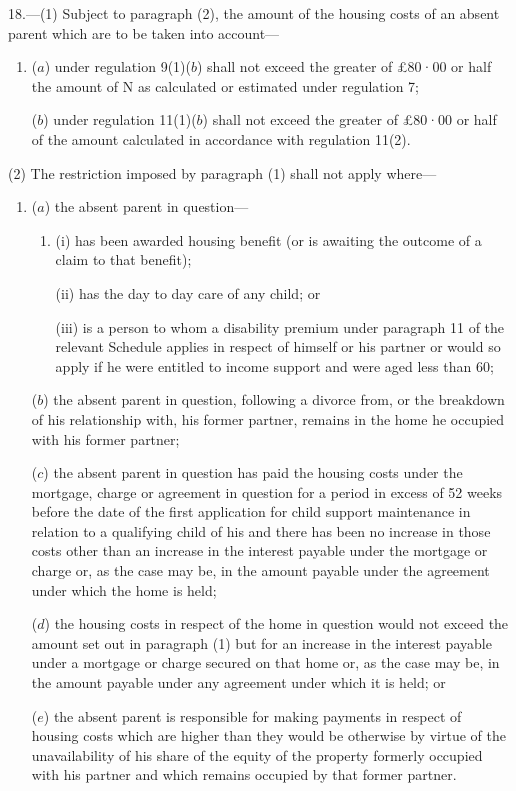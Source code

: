 \documentclass[12pt,a4paper]{article}
\begin{document}
18.—(1) Subject to paragraph (2), the amount of the housing costs of an absent parent which are to be taken into account—
\begin{enumerate}\item[]
($a$) under regulation 9(1)($b$) shall not exceed the greater of £80·00 or half the amount of N as calculated or estimated under regulation 7;

($b$) under regulation 11(1)($b$) shall not exceed the greater of £80·00 or half of the amount calculated in accordance with regulation 11(2).
\end{enumerate}

(2) The restriction imposed by paragraph (1) shall not apply where—
\begin{enumerate}\item[]
($a$) the absent parent in question—
\begin{enumerate}\item[]
(i) has been awarded housing benefit (or is awaiting the outcome of a claim to that benefit);

(ii) has the day to day care of any child; or

(iii) is a person to whom a disability premium under paragraph 11 of the relevant Schedule applies in respect of himself or his partner or would so apply if he were entitled to income support and were aged less than 60;
\end{enumerate}

($b$) the absent parent in question, following a divorce from, or the breakdown of his relationship with, his former partner, remains in the home he occupied with his former partner;

($c$) the absent parent in question has paid the housing costs under the mortgage, charge or agreement in question for a period in excess of 52 weeks before the date of the first application for child support maintenance in relation to a qualifying child of his and there has been no increase in those costs other than an increase in the interest payable under the mortgage or charge or, as the case may be, in the amount payable under the agreement under which the home is held;

($d$) the housing costs in respect of the home in question would not exceed the amount set out in paragraph (1) but for an increase in the interest payable under a mortgage or charge secured on that home or, as the case may be, in the amount payable under any agreement under which it is held; or

($e$) the absent parent is responsible for making payments in respect of housing costs which are higher than they would be otherwise by virtue of the unavailability of his share of the equity of the property formerly occupied with his partner and which remains occupied by that former partner.
\end{enumerate}
\end{document}
